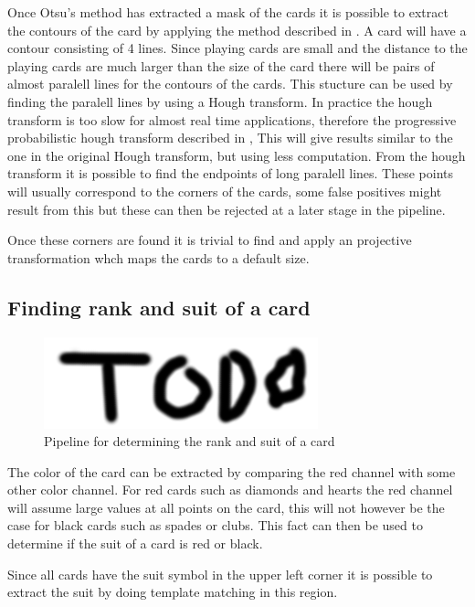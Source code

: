 \documentclass[journal,twoside]{IEEEtran}
\begin{document}
Once Otsu's method has extracted a mask of the cards it is possible to extract the contours of the card by applying the method described in \cite{CONTOURS}. A card will have a contour consisting of 4 lines. Since playing cards are small and the distance to the playing cards are much larger than the size of the card there will be pairs of almost paralell lines for the contours of the cards. This stucture can be used by finding the paralell lines by using a Hough transform. In practice the hough transform is too slow for almost real time applications, therefore the progressive probabilistic hough transform described in \cite{HoughP}, This will give results similar to the one in the original Hough transform, but using less computation. From the hough transform it is possible to find the endpoints of long paralell lines. These points will usually correspond to the corners of the cards, some false positives might result from this but these can then be rejected at a later stage in the pipeline.

Once these corners are found it is trivial to find and apply an projective transformation whch maps the cards to a default size.

\subsection{Finding rank and suit of a card}

\begin{figure}[placement h]
\centering
\includegraphics[scale=0.4, trim= 0cm 0cm 0cm 0cm]{TODO.png}
\caption{Pipeline for determining the rank and suit of a card}
\label{fig:RankSuitOutline}
\end{figure}

The color of the card can be extracted by comparing the red channel with some other color channel. For red cards such as diamonds and hearts the red channel will assume large values at all points on the card, this will not however be the case for black cards such as spades or clubs. This fact can then be used to determine if the suit of a card is red or black.

Since all cards have the suit symbol in the upper left corner it is possible to extract the suit by doing template matching in this region.
\end{document}
